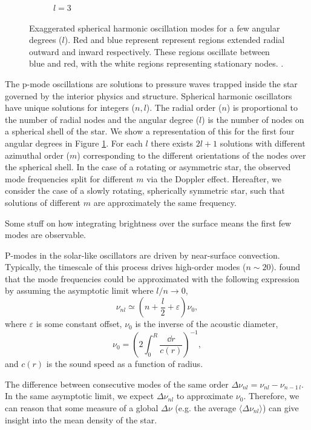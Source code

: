 \begin{figure}[tb]
\begin{subfigure}[b]{0.25\linewidth}
        \caption*{$l=3$}
    \end{subfigure}%
    \caption{Exaggerated spherical harmonic oscillation modes for a few angular degrees ($l$). Red and blue represent represent regions extended radial outward and inward respectively. These regions oscillate between blue and red, with the white regions representing stationary nodes. .}
    \label{fig:spherical-harmonics}
\end{figure}

The p-mode oscillations are solutions to pressure waves trapped inside the star governed by the interior physics and structure. Spherical harmonic oscillators have unique solutions for integers (\(n, l\)). The radial order (\(n\)) is proportional to the number of radial nodes and the angular degree (\(l\)) is the number of nodes on a spherical shell of the star. We show a representation of this for the first four angular degrees in Figure \ref{fig:spherical-harmonics}. For each \(l\) there exists \(2l+1\) solutions with different azimuthal order (\(m\)) corresponding to the different orientations of the nodes over the spherical shell. In the case of a rotating or asymmetric star, the observed mode frequencies split for different \(m\) via the Doppler effect. Hereafter, we consider the case of a slowly rotating, spherically symmetric star, such that solutions of different \(m\) are approximately the same frequency.

Some stuff on how integrating brightness over the surface means the first few modes are observable.

P-modes in the solar-like oscillators are driven by near-surface convection. Typically, the timescale of this process drives high-order modes (\(n \sim 20\)). \citet{Tassoul1980} found that the mode frequencies could be approximated with the following expression by assuming the asymptotic limit where \(l/n \rightarrow 0\),
%
\begin{equation}
    \nu_{nl} \simeq \left(n + \frac{l}{2} + \varepsilon\right) \nu_0,
\end{equation}
%
where \(\varepsilon\) is some constant offset, \(\nu_0\) is the inverse of the acoustic diameter,
%
\begin{equation}
    \nu_0 = \left(2 \int_{0}^{R} \frac{\dd r}{c(r)}\right)^{-1},
\end{equation}
%
and \(c(r)\) is the sound speed as a function of radius.

The difference between consecutive modes of the same order \(\Delta\nu_{nl} = \nu_{nl} - \nu_{n-1\,l}\). In the same asymptotic limit, we expect \(\Delta\nu_{nl}\) to approximate \(\nu_0\). Therefore, we can reason that some measure of a global \(\Delta\nu\) (e.g. the average \(\langle\Delta\nu_{nl}\rangle\)) can give insight into the mean density of the star.

